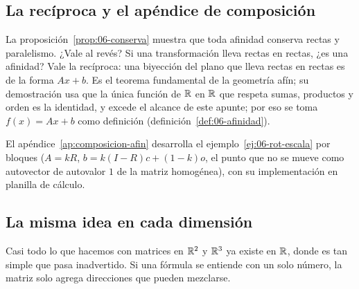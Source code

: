 \subsection{La recíproca y el apéndice de composición}\label{sec:06-reciproca}

La proposición~\ref{prop:06-conserva} muestra que toda afinidad conserva rectas y
paralelismo. ¿Vale al revés? Si una transformación lleva rectas en rectas, ¿es una afinidad?
Vale la recíproca: una biyección del plano que lleva rectas en rectas
es de la forma \(Ax+b\). Es el teorema fundamental de la geometría afín; su demostración usa
que la única función de \(\mathbb{R}\) en \(\mathbb{R}\) que respeta sumas, productos y orden es la
identidad, y excede el alcance de este apunte; por eso se toma \(f(x)=Ax+b\) como definición
(definición~\ref{def:06-afinidad}).

El apéndice~\ref{ap:composicion-afin} desarrolla el ejemplo~\ref{ej:06-rot-escala} por
bloques (\(A=kR\), \(b=k(I-R)c+(1-k)o\), el punto que no se mueve como autovector de autovalor \(1\) de la
matriz homogénea), con su implementación en planilla de cálculo.

\subsection{La misma idea en cada dimensión}\label{sec:misma-idea}

Casi todo lo que hacemos con matrices en \(\mathbb{R}^2\) y \(\mathbb{R}^3\) ya existe en \(\mathbb{R}\), donde es tan
simple que pasa inadvertido. Si una fórmula se entiende con un solo número, la matriz solo
agrega direcciones que pueden mezclarse.

